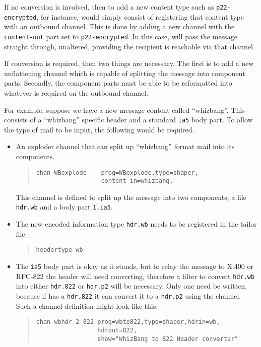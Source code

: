 If no conversion is involved, then to add a new content type such as
\linebreak
\verb|p22-encrypted|, for instance, would simply consist of registering
that content type with an outbound channel. This is done by adding a
new channel with the 
\linebreak
\verb|content-out| part set to
\verb|p22-encrypted|. In this case,  will pass the message
straight through, unaltered, providing the recipient is reachable via
that channel.

If conversion is required, then two things are necessary. The first is
to add a new unflattening channel which is capable of splitting the
message into component parts. Secondly, the component parts must be
able to be reformatted into whatever is required on the outbound channel.

For example, suppose we have a new message content called
``whizbang''. This consists of a ``whizbang'' specific header and a
standard \verb|ia5| body part. To allow the type of mail to be input,
the following would be required.
\begin{itemize}
\item	An exploder channel that can split up ``whizbang'' format mail
into its components.
\begin{quote}\small\begin{verbatim}
chan WBexplode    prog=WBexplode,type=shaper,
                  content-in=whizbang,
\end{verbatim}\end{quote}
This channel is defined to split up the message into two
components, a file \verb|hdr.wb| and a body part \verb|1.ia5|.

\item	The new encoded information type \verb|hdr.wb| needs to be
registered in the tailor file
\begin{quote}\small\begin{verbatim}
headertype wb
\end{verbatim}\end{quote}

\item	The \verb|ia5| body part is okay as it stands, but to relay the
message to X.400 or RFC-822 the header will need converting, therefore
a filter to convert \verb|hdr.wb| into either \verb|hdr.822| or
\verb|hdr.p2| will be necessary. Only one need be written, because if
 has a \verb|hdr.822| it can convert it to a \verb|hdr.p2|
using the  channel. Such a channel definition might look
like this:
\begin{quote}\small\begin{verbatim}
chan wbhdr-2-822 prog=wbto822,type=shaper,hdrin=wb,
                 hdrout=822,
                 show="WhizBang to 822 Header converter"
\end{verbatim}\end{quote}
\end{itemize}

